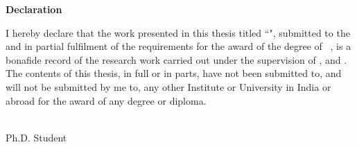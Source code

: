 \setmainfont[ Path = font/,
 BoldFont={CandaraBI}, 
 ItalicFont={booki},
 BoldItalicFont={bookbi}
 ]{bookr}



\begin{flushright}
\huge{ \textbf{Declaration}}
\end{flushright}
{ I hereby declare that the work presented in this thesis titled ``\emph{\ttitle{}}", submitted to the \iitj{} and \aiimsj{} in partial fulfilment of the requirements for the award of the degree of~ \degree, is a bonafide record of the research work carried out under the supervision of \supname{}, \cosupname{} and \caresupname{}. The contents of this thesis, in full or in parts, have not been submitted to, and will not be submitted by me to, any other Institute or University in India or abroad for the award of any degree or diploma.}
\vspace{2cm}
\begin{flushright}
\emph{\authorname}\\
Ph.D. Student \\
\deptname \\
\iitaiims
\end{flushright}
